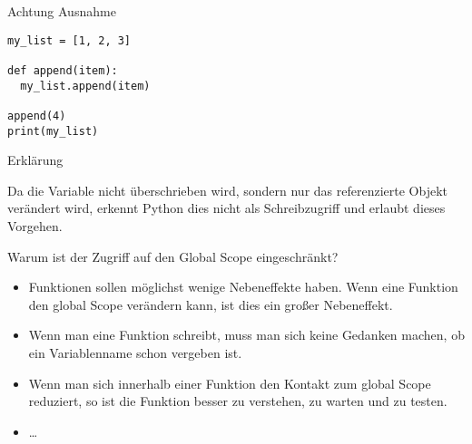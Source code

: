 \begin{fragile}
\begin{alertblock}{Achtung Ausnahme}
\begin{verbatim}
my_list = [1, 2, 3]

def append(item):
  my_list.append(item)

append(4)
print(my_list)
\end{verbatim}
\end{alertblock}

\vspace{12pt}

\begin{exampleblock}{Erklärung}
	
\pause 

Da die Variable  nicht überschrieben wird, sondern nur das referenzierte Objekt verändert wird, erkennt Python dies nicht als Schreibzugriff und erlaubt dieses Vorgehen. 
\end{exampleblock}
\end{fragile}


\begin{frame}
	
\begin{block}{Warum ist der Zugriff auf den Global Scope eingeschränkt?}
	\pause 
	\begin{itemize}[<+->]
		\item Funktionen sollen möglichst wenige Nebeneffekte haben. Wenn eine Funktion den global Scope verändern kann, ist dies ein großer Nebeneffekt. 
		\item Wenn man eine Funktion schreibt, muss man sich keine Gedanken machen, ob ein Variablenname schon vergeben ist. 
		\item Wenn man sich innerhalb einer Funktion den Kontakt zum global Scope reduziert, so ist die Funktion besser zu verstehen, zu warten und zu testen. 
		\item \dots
	\end{itemize}
\end{block}
	
	
\end{frame}



